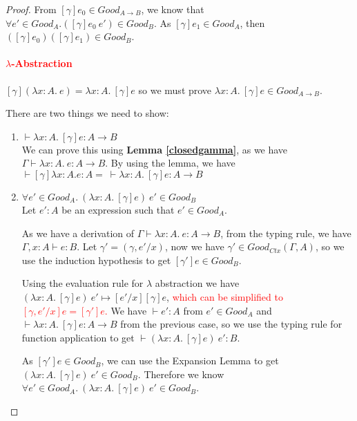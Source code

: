 \begin{proof}
From $[\gamma]e_0 \in Good_{A \to B}$, we know that $\forall e' \in Good_A. ([\gamma]e_0 \ e') \in Good_B$. As $[\gamma]e_1 \in Good_A$, then $([\gamma]e_0)([\gamma]e_1) \in Good_B$.

\paragraph{\textcolor{red}{$\lambda$-Abstraction}} $[\gamma] (\lambda x:A. \ e) = \lambda x:A. \ [\gamma] e$ so we must prove $\lambda x:A. \ [\gamma] e \in Good_{A \to B}$.  

There are two things we need to show:

\begin{enumerate}
\item{$\vdash \lambda x:A. \ [\gamma] e : A \to B$ \\ 
We can prove this using \textbf{Lemma \ref{closedgamma}}, as we have $\Gamma \vdash \lambda x : A . \ e : A \to B$. By using the lemma, we have $\vdash [\gamma]\lambda x : A . e : A = \ \vdash \lambda x : A . \ [\gamma] e : A \to B$}

\item{$\forall e' \in Good_A. \ (\lambda x:A. \ [\gamma]e) \ e' \in Good_B$ \\
Let $e':A$ be an expression such that $e' \in Good_A$. 

As we have a derivation of $\Gamma \vdash \lambda x:A. \ e : A \to B$, from the typing rule, we have $\Gamma, x:A \vdash e: B$. Let $\gamma' = (\gamma, e'/x)$, now we have $\gamma' \in Good_{Ctx}(\Gamma, A)$, so we use the induction hypothesis to get $[\gamma']e \in Good_B$.


Using the evaluation rule for $\lambda$ abstraction we have $(\lambda x:A. \ [\gamma]e) \ e' \mapsto [e'/x][\gamma]e$, \textcolor{red}{which can be simplified to $[\gamma, e'/x]e = [\gamma']e$.} We have $\vdash e' : A$ from $e' \in Good_A$ and $\vdash \lambda x:A. \ [\gamma] e : A \to B$ from the previous case, so we use the typing rule for function application to get $\vdash (\lambda x:A. \ [\gamma]e) \ e' : B$.

As $[\gamma']e \in Good_B$, we can use the Expansion Lemma to get $(\lambda x:A. \ [\gamma]e) \ e' \in Good_B$. Therefore we know $\forall e' \in Good_A. \ (\lambda x:A. \ [\gamma]e) \ e' \in Good_B$.}
\end{enumerate}


\end{proof}
